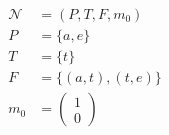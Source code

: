 \begin{align*}
\mathcal{N}&=(P,T,F,m_0)\\
P&=\{a,e\}\\
T&=\{t\}\\
F&=\{(a,t),(t,e)\}\\
m_0&=\begin{pmatrix}
1\\0
\end{pmatrix}
\end{align*}
